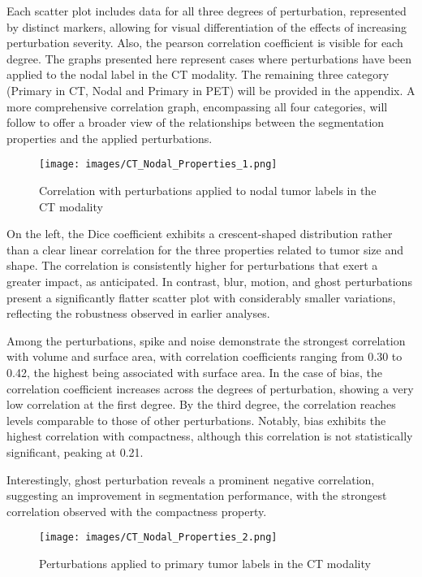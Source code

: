 Each scatter plot includes data for all three degrees of perturbation, represented by distinct markers, allowing for visual differentiation of the effects of increasing perturbation severity. Also, the pearson correlation coefficient is visible for each degree.
The graphs presented here represent cases where perturbations have been applied to the nodal label in the CT modality. 
The remaining three category (Primary in CT, Nodal and Primary in PET) will be provided in the appendix. A more comprehensive correlation graph, encompassing all 
four categories, will follow to offer a broader view of the relationships between the segmentation properties and the applied perturbations.
\begin{figure}[ht]
    \centering
    \texttt{[image: images/CT\_Nodal\_Properties\_1.png]}
    \caption{Correlation with perturbations applied to nodal tumor labels in the CT modality}
    \label{fig:three_subfigures}
\end{figure}

On the left, the Dice coefficient exhibits a crescent-shaped distribution rather than a clear linear correlation for the three properties related to tumor size and shape. The correlation is consistently higher for perturbations that exert a greater impact, as anticipated. In contrast, blur, motion, and ghost perturbations present a significantly flatter scatter plot with considerably smaller variations, reflecting the robustness observed in earlier analyses.

Among the perturbations, spike and noise demonstrate the strongest correlation with volume and surface area, with correlation coefficients ranging from 0.30 to 0.42, the highest being associated with surface area. In the case of bias, the correlation coefficient increases across the degrees of perturbation, showing a very low correlation at the first degree. By the third degree, the correlation reaches levels comparable to those of other perturbations. Notably, bias exhibits the highest correlation with compactness, although this correlation is not statistically significant, peaking at 0.21.

Interestingly, ghost perturbation reveals a prominent negative correlation, suggesting an improvement in segmentation performance, with the strongest correlation observed with the compactness property.
\begin{figure}[ht]
    \centering
    \texttt{[image: images/CT\_Nodal\_Properties\_2.png]}
    \caption{Perturbations applied to primary tumor labels in the CT modality}
    \label{fig:three_subfigures}
\end{figure}

